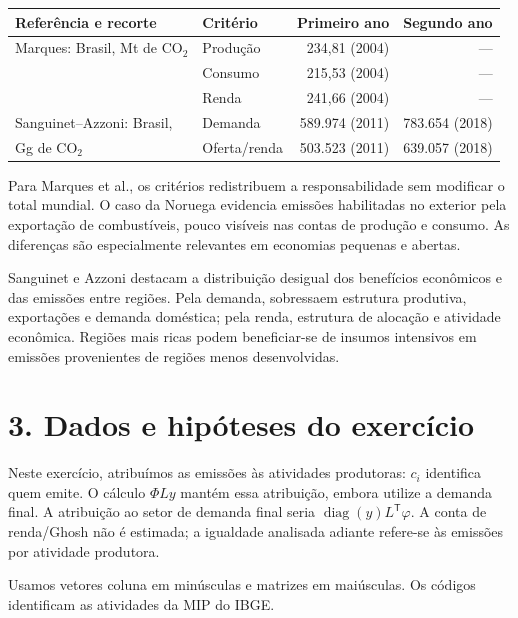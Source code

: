 \documentclass[12pt]{article}
\begin{document}
\begin{center}
\small
\begin{tabularx}{\linewidth}{Y l r r}
\toprule
Referência e recorte & Critério & Primeiro ano & Segundo ano\\
\midrule
Marques: Brasil, Mt de CO$_2$ & Produção & 234,81 (2004) & ---\\
 & Consumo & 215,53 (2004) & ---\\
 & Renda & 241,66 (2004) & ---\\
\midrule
Sanguinet--Azzoni: Brasil, & Demanda & 589.974 (2011) & 783.654 (2018)\\
Gg de CO$_2$ & Oferta/renda & 503.523 (2011) & 639.057 (2018)\\
\bottomrule
\end{tabularx}
\end{center}

Para Marques et al., os critérios redistribuem a responsabilidade sem modificar o total mundial. O caso da Noruega evidencia emissões habilitadas no exterior pela exportação de combustíveis, pouco visíveis nas contas de produção e consumo. As diferenças são especialmente relevantes em economias pequenas e abertas.

Sanguinet e Azzoni destacam a distribuição desigual dos benefícios econômicos e das emissões entre regiões. Pela demanda, sobressaem estrutura produtiva, exportações e demanda doméstica; pela renda, estrutura de alocação e atividade econômica. Regiões mais ricas podem beneficiar-se de insumos intensivos em emissões provenientes de regiões menos desenvolvidas.



\newpage
\section*{3. Dados e hipóteses do exercício}
Neste exercício, atribuímos as emissões às atividades produtoras: $c_i$ identifica quem emite. O cálculo $\Phi Ly$ mantém essa atribuição, embora utilize a demanda final. A atribuição ao setor de demanda final seria $\operatorname{diag}(y)L^{\mathsf T}\varphi$. A conta de renda/Ghosh não é estimada; a igualdade analisada adiante refere-se às emissões por atividade produtora.

Usamos vetores coluna em minúsculas e matrizes em maiúsculas. Os códigos identificam as atividades da MIP do IBGE.
\end{document}
